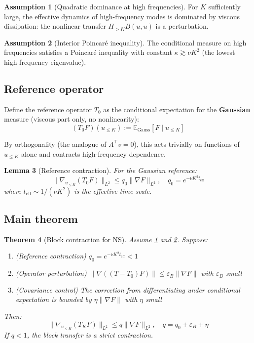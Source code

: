 \documentclass[11pt]{article}
\newtheorem{theorem}{Theorem}[section]
\newtheorem{lemma}[theorem]{Lemma}
\theoremstyle{definition}
\newtheorem{assumption}[theorem]{Assumption}
\newcommand{\E}{\mathbb{E}}
\begin{document}
\begin{assumption}[Quadratic dominance at high frequencies]\label{ass:quad-dom}
For $K$ sufficiently large, the effective dynamics of high-frequency modes is dominated by 
viscous dissipation: the nonlinear transfer $\Pi_{>K} B(u,u)$ is a perturbation.
\end{assumption}

\begin{assumption}[Interior Poincaré inequality]\label{ass:poincare}
The conditional measure on high frequencies satisfies a Poincaré inequality with constant 
$\kappa \gtrsim \nu K^2$ (the lowest high-frequency eigenvalue).
\end{assumption}

\subsection{Reference operator}

Define the reference operator $T_0$ as the conditional expectation for the \textbf{Gaussian} 
measure (viscous part only, no nonlinearity):
\begin{equation}
(T_0 F)(u_{\leq K}) := \E_{\text{Gauss}}[F \mid u_{\leq K}]
\end{equation}

By orthogonality (the analogue of $A^\top v = 0$), this acts trivially on functions of 
$u_{\leq K}$ alone and contracts high-frequency dependence.

\begin{lemma}[Reference contraction]
For the Gaussian reference:
\begin{equation}
\|\nabla_{u_{\leq K}} (T_0 F)\|_{L^2} \leq q_0 \|\nabla F\|_{L^2}, \quad 
q_0 = e^{-\nu K^2 t_{\mathrm{eff}}}
\end{equation}
where $t_{\mathrm{eff}} \sim 1/(\nu K^2)$ is the effective time scale.
\end{lemma}

\subsection{Main theorem}

\begin{theorem}[Block contraction for NS]\label{thm:ns-contract}
Assume \ref{ass:quad-dom} and \ref{ass:poincare}. Suppose:
\begin{enumerate}
\item (Reference contraction) $q_0 = e^{-\nu K^2 t_{\mathrm{eff}}} < 1$
\item (Operator perturbation) $\|\nabla((T-T_0)F)\| \leq \varepsilon_B \|\nabla F\|$ with $\varepsilon_B$ small
\item (Covariance control) The correction from differentiating under conditional expectation 
is bounded by $\eta \|\nabla F\|$ with $\eta$ small
\end{enumerate}
Then:
\begin{equation}
\|\nabla_{u_{\leq K}} (T_K F)\|_{L^2} \leq q \|\nabla F\|_{L^2}, \quad q = q_0 + \varepsilon_B + \eta
\end{equation}
If $q < 1$, the block transfer is a strict contraction.
\end{theorem}
\end{document}
